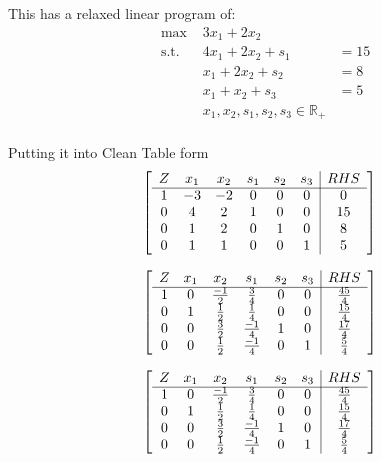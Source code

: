 \documentclass[10pt, letterpaper]{paper}
\begin{document}
This has a relaxed linear program of:
\begin{equation*}
\begin{alignedat}{3}
&\text{max }&3x_1 + 2x_2&\\
&\text{s.t. } &4x_1 +2x_2 + s_1&= 15\\
& &x_1 + 2x_2 + s_2  &= 8\\
& &x_1 + x_2 + s_3 &= 5\\
& &x_1,x_2,s_1,s_2,s_3 \in \mathbb{R}_+ &\\
\end{alignedat}
\end{equation*}



Putting it into Clean Table form
\[
	\left[ {\begin{array}{cccccc|c}
	Z & x_1 & x_2 & s_1 & s_2 & s_3 &  RHS\\ \cline{1-7}
	1 & -3 & -2 & 0 & 0 & 0  &0 \\
	0 & 4 & 2 & 1 & 0 & 0 & 15 \\
	0 & 1 & 2 & 0 & 1 & 0 & 8 \\
	0 & 1 & 1 & 0 & 0 & 1 & 5  \\
	\end{array} } \right]
\]

\[
	\left[ {\begin{array}{cccccc|c}
	Z & x_1 & x_2 & s_1 & s_2 & s_3 &  RHS\\ \cline{1-7}
	1 & 0  & \frac{-1}{2} & \frac{3}{4} & 0 & 0  &\frac{45}{4} \\
	0 & 1 & \frac{1}{2} & \frac{1}{4} & 0 & 0 & \frac{15}{4} \\
	0 & 0 & \frac{3}{2} & \frac{-1}{4} & 1 & 0 & \frac{17}{4} \\
	0 & 0 & \frac{1}{2} & \frac{-1}{4} & 0 & 1 & \frac{5}{4}  \\
	\end{array} } \right]
\]

\[
	\left[ {\begin{array}{cccccc|c}
	Z & x_1 & x_2 & s_1 & s_2 & s_3 &  RHS\\ \cline{1-7}
	1 & 0 & \frac{-1}{2} & \frac{3}{4} & 0 & 0  &\frac{45}{4} \\
	0 & 1 & \frac{1}{2} & \frac{1}{4} & 0 & 0 & \frac{15}{4} \\
	0 & 0 & \frac{3}{2} & \frac{-1}{4} & 1 & 0 & \frac{17}{4} \\
	0 & 0 & \frac{1}{2} & \frac{-1}{4} & 0 & 1 & \frac{5}{4}  \\
	\end{array} } \right]
\]
\end{document}
